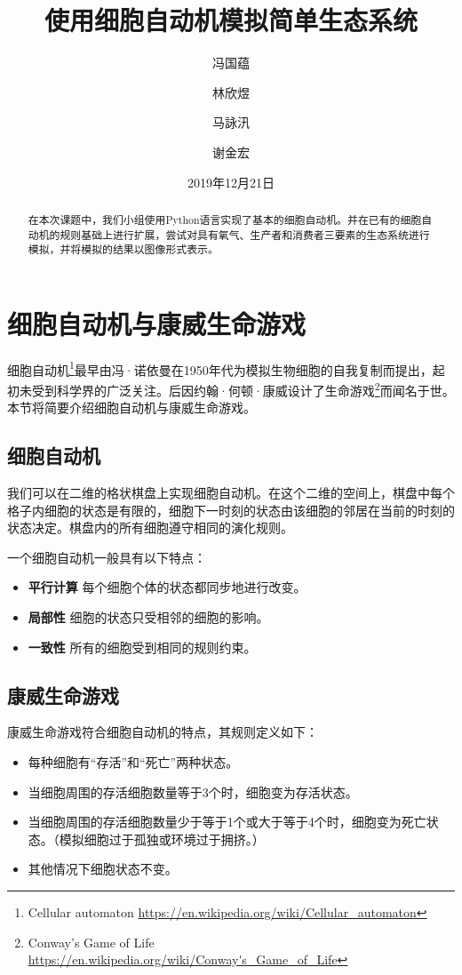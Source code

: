 \documentclass{ctexart}
\author{
	冯国蕴 \and 林欣煜 \and 马詠汛 \and 谢金宏
}
\title{使用细胞自动机模拟简单生态系统}
\date{2019年12月21日}
\begin{document}
\maketitle

\begin{abstract}
在本次课题中，我们小组使用Python语言实现了基本的细胞自动机。并在已有的细胞自动机的规则基础上进行扩展，尝试对具有氧气、生产者和消费者三要素的生态系统进行模拟，并将模拟的结果以图像形式表示。
\end{abstract}

\tableofcontents

\section{细胞自动机与康威生命游戏}

细胞自动机\footnote{Cellular automaton \url{https://en.wikipedia.org/wiki/Cellular_automaton}}最早由冯·诺依曼在1950年代为模拟生物细胞的自我复制而提出，起初未受到科学界的广泛关注。后因约翰·何顿·康威设计了生命游戏\footnote{Conway's Game of Life \url{https://en.wikipedia.org/wiki/Conway's_Game_of_Life}}而闻名于世。本节将简要介绍细胞自动机与康威生命游戏。

\subsection{细胞自动机}

我们可以在二维的格状棋盘上实现细胞自动机。在这个二维的空间上，棋盘中每个格子内细胞的状态是有限的，细胞下一时刻的状态由该细胞的邻居在当前的时刻的状态决定。棋盘内的所有细胞遵守相同的演化规则。

一个细胞自动机一般具有以下特点：

\begin{itemize}
  \item \textbf{平行计算 }每个细胞个体的状态都同步地进行改变。
  \item \textbf{局部性 }细胞的状态只受相邻的细胞的影响。
  \item \textbf{一致性 }所有的细胞受到相同的规则约束。
\end{itemize}

\subsection{康威生命游戏}

康威生命游戏符合细胞自动机的特点，其规则定义如下：

\begin{itemize}
  \item 每种细胞有“存活”和“死亡”两种状态。
  \item 当细胞周围的存活细胞数量等于3个时，细胞变为存活状态。
  \item 当细胞周围的存活细胞数量少于等于1个或大于等于4个时，细胞变为死亡状态。（模拟细胞过于孤独或环境过于拥挤。）
  \item 其他情况下细胞状态不变。
\end{itemize}
\end{document}
